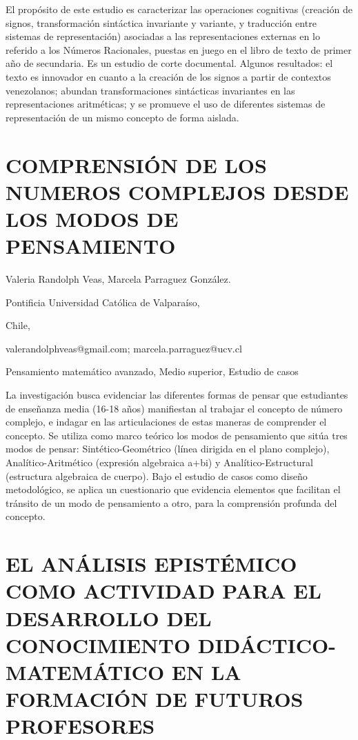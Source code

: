 El propósito de este estudio es caracterizar las operaciones cognitivas
(creación de signos, transformación sintáctica invariante y variante,
y traducción entre sistemas de representación) asociadas a las representaciones
externas en lo referido a los Números Racionales, puestas en juego
en el libro de texto de primer año de secundaria. Es un estudio de
corte documental. Algunos resultados: el texto es innovador en cuanto
a la creación de los signos a partir de contextos venezolanos; abundan
transformaciones sintácticas invariantes en las representaciones aritméticas;
y se promueve el uso de diferentes sistemas de representación de un
mismo concepto de forma aislada.


\section{COMPRENSIÓN DE LOS NUMEROS COMPLEJOS DESDE LOS MODOS DE PENSAMIENTO }

\begin{datos}

Valeria Randolph Veas, Marcela Parraguez González.

Pontificia Universidad Católica de Valparaíso,

Chile,

valerandolphveas@gmail.com; marcela.parraguez@ucv.cl 

\end{datos}

Pensamiento matemático avanzado, Medio superior, Estudio de casos

La investigación busca evidenciar las diferentes formas de pensar
que estudiantes de enseñanza media (16-18 años) manifiestan al trabajar
el concepto de número complejo, e indagar en las articulaciones de
estas maneras de comprender el concepto. Se utiliza como marco teórico
los modos de pensamiento que sitúa tres modos de pensar: Sintético-Geométrico
(línea dirigida en el plano complejo), Analítico-Aritmético (expresión
algebraica a+bi) y Analítico-Estructural (estructura algebraica de
cuerpo). Bajo el estudio de casos como diseño metodológico, se aplica
un cuestionario que evidencia elementos que facilitan el tránsito
de un modo de pensamiento a otro, para la comprensión profunda del
concepto. 


\section{EL ANÁLISIS EPISTÉMICO COMO ACTIVIDAD PARA EL DESARROLLO DEL CONOCIMIENTO
DIDÁCTICO-MATEMÁTICO EN LA FORMACIÓN DE FUTUROS PROFESORES }

